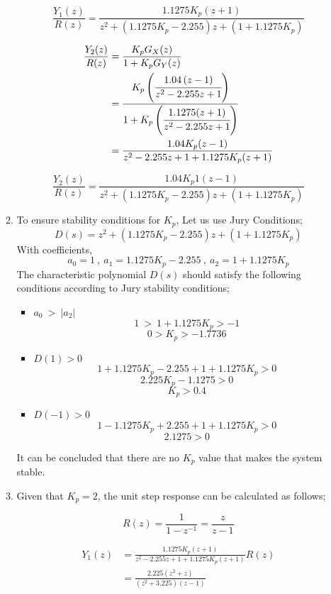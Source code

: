 \documentclass[a4paper,12pt]{article}
\begin{document}
\begin{enumerate}
\begin{enumerate}
			$$\boxed{\frac{Y_1(z)}{R(z)} =  \frac{1.1275K_p(z+1)}{z^2+(1.1275K_p-2.255)z+(1+1.1275K_p) }}  $$	
				
			\begin{equation*}
				\begin{split}	
					\frac{Y_2(z)}{R(z)} &= \frac{K_p G_X(z)}{1+K_pG_Y(z)} \\
					& = \cfrac{K_p \left(\cfrac{1.04  \left(z-1 \right)}{z^2-2.255z+1 }\right)}{1+K_p\left(\cfrac{1.1275(z+1)}{z^2-2.255z+1}\right)} \\
					&=\frac{1.04 K_p(z-1 )}{z^2-2.255z+1+1.1275K_p(z+1)}
				\end{split} 
			\end{equation*} 
			
			$$\boxed{\frac{Y_2(z)}{R(z)} =   \frac{1.04 K_p1(z-1 )}{z^2+(1.1275K_p-2.255)z+(1+1.1275K_p) } }   $$	
			
			
			\newpage
		
		
		
		\item To ensure stability conditions for $K_p$, Let us use Jury Conditions;
		$$ D(s)= z^2+(1.1275K_p-2.255)z+(1+1.1275K_p) $$
		With coefficients, 
		$$ \boxed{a_0=1} \ , \ \boxed{a_1=1.1275K_p-2.255} \ ,\ \boxed{a_2=1+1.1275K_p} $$		
		The characteristic polynomial $D(s)$ should satisfy the following conditions according to Jury stability conditions;
		\begin{itemize}
			\item $a_0\ >\ |a_2| $ \\
				$$ 1\ >\ 1+1.1275K_p > -1 $$
				$$\boxed{ 0 > K_p > -1.7736 }$$
			\item $D(1)>0$ \\
				$$ 1+1.1275K_p-2.255+1+1.1275K_p > 0$$
				$$ 2.225K_p-1.1275>0$$
				$$ \boxed{ K_p>0.4} $$
			\item $D(-1)>0$ \\
				$$ 1-1.1275K_p+2.255+1+1.1275K_p > 0$$
				$$\boxed{ 2.1275>0 }$$				
		\end{itemize}
		It can be concluded that there are no $K_p$ value that makes the system stable.
		
		
 		\item Given that $K_p=2$, the unit step response can be calculated as follows;
 		
 		$$ R(z)= \frac{1}{1-z^{-1}}=\frac{z}{z-1}  $$
 		
 		\begin{equation*}
 			\begin{split}
	 			Y_1(z) &=  \frac{1.1275K_p(z+1)}{z^2-2.255z+1+1.1275K_p(z+1)} R(z)  \\	
 				&=  \frac{2.225(z^2+z)}{(z^2+3.225)(z-1)} \\ 
 			\end{split}
 		\end{equation*}
 		

\end{enumerate}
\end{enumerate}
\end{document}

